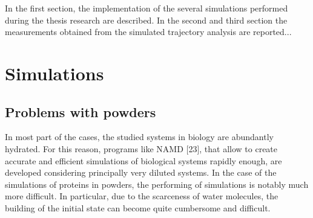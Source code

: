 In the first section, the implementation of the several simulations performed during the thesis research are described. 
In the second and third section the measurements obtained from the simulated trajectory analysis are reported...

\section{Simulations}
\subsection{Problems with powders}
In most part of the cases, the studied systems in biology are abundantly hydrated. For this reason, programs like NAMD [23], that allow to create accurate and efficient simulations of biological systems rapidly enough, are developed considering principally very diluted systems. In the case of the simulations of proteins in powders, the performing of simulations is notably much more difficult. In particular, due to the scarceness of water molecules, the building of the initial state can become quite cumbersome and difficult.

